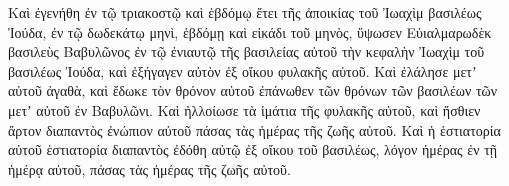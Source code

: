 {\par }{\PP {}Καὶ ἐγενήθη ἐν τῷ τριακοστῷ καὶ ἑβδόμῳ ἔτει τῆς ἀποικίας τοῦ Ἰωαχὶμ βασιλέως Ἰούδα, ἐν τῷ δωδεκάτῳ μηνὶ, ἑβδόμῃ καὶ εἰκάδι τοῦ μηνὸς, ὕψωσεν Εὐιαλμαρωδὲκ βασιλεὺς Βαβυλῶνος ἐν τῷ ἐνιαυτῷ τῆς βασιλείας αὐτοῦ τὴν κεφαλὴν Ἰωαχὶμ τοῦ βασιλέως Ἰούδα, καὶ ἐξήγαγεν αὐτὸν ἐξ οἴκου φυλακῆς αὐτοῦ.
Καὶ ἐλάλησε μετʼ αὐτοῦ ἀγαθὰ, καὶ ἔδωκε τὸν θρόνον αὐτοῦ ἐπάνωθεν τῶν θρόνων τῶν βασιλέων τῶν μετʼ αὐτοῦ ἐν Βαβυλῶνι.
Καὶ ἠλλοίωσε τὰ ἱμάτια τῆς φυλακῆς αὐτοῦ, καὶ ἤσθιεν ἄρτον διαπαντὸς ἐνώπιον αὐτοῦ πάσας τὰς ἡμέρας τῆς ζωῆς αὐτοῦ.
Καὶ ἡ ἑστιατορία αὐτοῦ ἑστιατορία διαπαντὸς ἐδόθη αὐτῷ ἐξ οἴκου τοῦ βασιλέως, λόγον ἡμέρας ἐν τῇ ἡμέρᾳ αὐτοῦ, πάσας τὰς ἡμέρας τῆς ζωῆς αὐτοῦ.
\par }